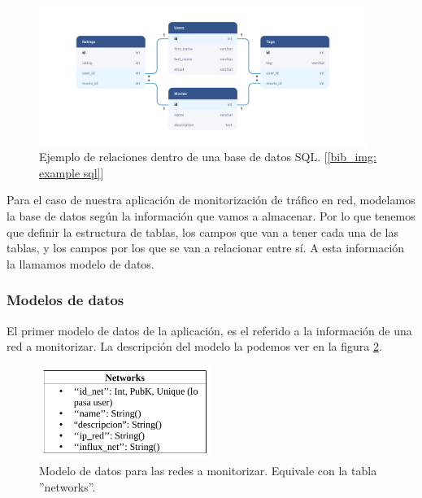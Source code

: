\documentclass[a4paper, oneside, 12pt]{book}
\begin{document}
	\begin{figure}[h!]
		\begin{center}
			\includegraphics[width=0.95\textwidth]{img/example_relational_database.jpg}
			\caption{Ejemplo de relaciones dentro de una base de datos SQL. [\ref{bib_img: example sql}]}
			\label{img: example sql}
		\end{center}
	\end{figure}
	
	\noindent Para el caso de nuestra aplicación de monitorización de tráfico en red, modelamos la base de datos según la información que vamos a almacenar. Por lo que tenemos que definir la estructura de tablas, los campos que van a tener cada una de las tablas, y los campos por los que se van a relacionar entre sí. A esta información la llamamos modelo de datos.
	
	\pagebreak
	
	\subsubsection{Modelos de datos}
	
	\noindent El primer modelo de datos de la aplicación, es el referido a la información de una red a monitorizar. La descripción del modelo la podemos ver en la figura \ref{img: modelo sql networks}.
	
	\begin{figure}[h!]
		\begin{center}
			\includegraphics[width=0.5\textwidth]{img/model_sql_networks.png}
			\caption{Modelo de datos para las redes a monitorizar. Equivale con la tabla ''networks''.}
			\label{img: modelo sql networks}
		\end{center}
	\end{figure}
	
\end{document}
